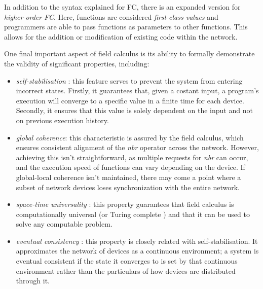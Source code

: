 \documentclass[12pt,a4paper,openright,twoside]{book}
\begin{document}
In addition to the syntax explained for FC, there is an expanded version for \emph{higher-order FC}. 
    Here, functions are considered \emph{first-class values} and programmers are able to pass functions as parameters 
    to other functions. This allows for the addition or modification of existing code within the network.

One final important aspect of field calculus is its ability to formally demonstrate the 
    validity of significant properties, including:
    \begin{itemize}
        \item \emph{self-stabilisation} \cite{viroli2018engineering, dolev2000self,lafuente2015fixpoint}:
        this feature serves to prevent the system from entering incorrect states. Firstly, it guarantees that, given a costant input, a program's 
        execution will converge to a specific value in a finite time for each device. Secondly, it ensures that this value is solely 
        dependent on the input and not on previous execution history.
        \item \emph{global coherence}: this characteristic is assured by the field calculus, which ensures consistent alignment of the \emph{nbr}
        operator across the network. However, achieving this isn't straightforward, as multiple requests for \emph{nbr} can occur, 
        and the execution speed of functions can vary depending on the device. 
        If global-local coherence isn't maintained, there may come a point where a subset of network devices loses 
        synchronization with the entire network.
        \item \emph{space-time universality} \cite{audrito2018space}: this property guarantees that field calculus is computationally 
        universal (or Turing complete \cite{turing2009computing, turing1936computable}) and that it can be used to solve any computable problem.
        \item \emph{eventual consistency} \cite{beal2017self}: this property is closely related with self-stabilisation. It approximates the network of devices
        as a continuous environment; a system is eventual consistent if the state it converges to is set by that continuous environment rather than 
        the particulars of how devices are distributed through it.
    \end{itemize}
    
\end{document}
